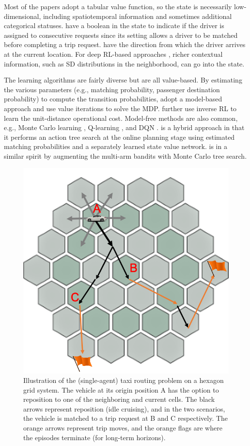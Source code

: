 \documentclass{article}
\begin{document}
Most of the papers adopt a tabular value function, so the state is necessarily low-dimensional, including spatiotemporal information and sometimes additional categorical statuses. \cite{shou2020optimal} have a boolean in the state to indicate if the driver is assigned to consecutive requests since its setting allows a driver to be matched before completing a trip request. \cite{rong2016rich,zhou2018optimizing} have the direction from which the driver arrives at the current location. 
For deep RL-based approaches \citep{wen2017rebalancing,jtq2021repos}, richer contextual information, such as SD distributions in the neighborhood, can go into the state.

The learning algorithms are fairly diverse but are all value-based. By estimating the various parameters (e.g., matching probability, passenger destination probability) to compute the transition probabilities, \cite{rong2016rich,yu2019markov,shou2020optimal,zhou2018optimizing} adopt a model-based approach and use value iterations to solve the MDP. 
\cite{shou2020optimal} further use inverse RL to learn the unit-distance operational cost.
Model-free methods are also common, e.g., Monte Carlo learning \citep{verma2017augmenting}, Q-learning \citep{han2016routing,gao2018optimize}, and DQN \citep{wen2017rebalancing}. \citep{jtq2021repos} is a hybrid approach in that it performs an action tree search at the online planning stage using estimated matching probabilities and a separately learned state value network. \citep{garg2018route} is in a similar spirit by augmenting the multi-arm bandits with Monte Carlo tree search.

\begin{figure}
\begin{center}
    \includegraphics[width=0.5\linewidth]{img/reposition_single.png}
	\caption{Illustration of the (single-agent) taxi routing problem on a hexagon grid system. The vehicle at its origin position A has the option to reposition to one of the neighboring and current cells. The black arrows represent reposition (idle cruising), and in the two scenarios, the vehicle is matched to a trip request at B and C respectively. The orange arrows represent trip moves, and the orange flags are where the episodes terminate (for long-term horizons).}
	\label{fig:reposition_single}
\end{center}
\end{figure}
\end{document}
